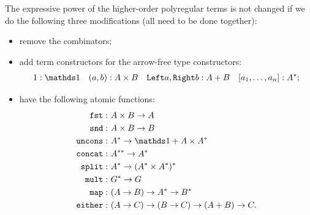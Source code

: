 \begin{lemma}\label{lem:fewer-atomic}
    The expressive power of the higher-order polyregular terms is  not changed if we do the following three modifications (all need to be done together): 
    \begin{itemize}
        \item remove the combinators;
        \item add term constructors for the arrow-free type constructors: 
        \begin{align*}
        1 : \onetype \quad (a,b) : A \times B \quad \leftterm a, \rightterm b : A+B \quad [a_1,\ldots,a_n] : A^*;
        \end{align*}
        \item have the following atomic functions:
            \begin{align*}
            \fstterm : &\  A \times B  \to A \\
            \sndterm : &\  A \times B  \to B \\
            \unconsterm : &\  A^* \to \onetype + A \times A^*\\
            \concatterm : &\ A^{**} \to A^* \\
            \splitterm : &\ A^* \to (A^* \times A^*)^*  \\
            \multterm : &\  G^* \to G  \\
        \mapterm  : &\   (A \to B) \to A^* \to B^* \\
        \mathtt{either}  : &\  (A \to C) \to (B \to C) \to (A+B) \to C.
        \end{align*}
    \end{itemize}
\end{lemma}
